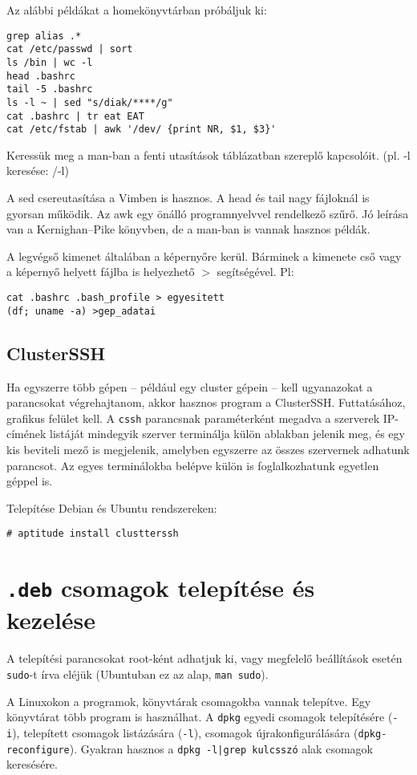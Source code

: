 \documentclass[a4paper]{article}
\newcommand{\code}{\texttt}
\begin{document}
Az alábbi példákat a homekönyvtárban próbáljuk ki:
\begin{Verbatim}
grep alias .*
cat /etc/passwd | sort
ls /bin | wc -l
head .bashrc
tail -5 .bashrc
ls -l ~ | sed "s/diak/****/g"
cat .bashrc | tr eat EAT
cat /etc/fstab | awk '/dev/ {print NR, $1, $3}'
\end{Verbatim}
Keressük meg a man-ban a fenti utasítások táblázatban szereplő
kapcsolóit. (pl. -l keresése: /-l)

A sed csereutasítása a Vimben is hasznos. A head és tail nagy fájloknál is
gyorsan működik. Az awk egy önálló programnyelvvel rendelkező szűrő.
Jó leírása van a Kernighan--Pike könyvben, de a man-ban is vannak
hasznos példák.

A legvégső kimenet általában a képernyőre kerül.  Bárminek a kimenete
cső vagy a képernyő  helyett fájlba is helyezhető $>$ segítségével.
Pl:
\begin{Verbatim}
cat .bashrc .bash_profile > egyesitett
(df; uname -a) >gep_adatai
\end{Verbatim}

\subsection{ClusterSSH}
Ha egyszerre több gépen -- például egy cluster gépein -- kell
ugyanazokat a parancsokat végrehajtanom, akkor hasznos program a
ClusterSSH. Futtatásához, grafikus felület kell. A \texttt{cssh}
parancsnak paraméterként megadva a szerverek IP-címének listáját
mindegyik szerver terminálja külön ablakban jelenik meg, és egy kis
beviteli mező is megjelenik, amelyben egyszerre az összes szervernek
adhatunk parancsot.  Az egyes terminálokba belépve külön is
foglalkozhatunk egyetlen géppel is.

Telepítése Debian és Ubuntu rendszereken:
\begin{Verbatim}
# aptitude install clustterssh
\end{Verbatim}

\newpage
\section{\code{.deb} csomagok telepítése és kezelése}

A telepítési parancsokat root-ként adhatjuk ki, vagy megfelelő
beállítások esetén \code{sudo}-t írva eléjük (Ubuntuban ez az alap,
\code{man sudo}).

A Linuxokon a programok, könyvtárak csomagokba vannak telepítve. Egy
könyvtárat több program is használhat. A \code{dpkg} egyedi csomagok
telepítésére  (\code{-i}), telepített csomagok listázására (\code{-l}),
csomagok újrakonfigurálására (\code{dpkg-reconfigure}).
Gyakran hasznos a \code{dpkg -l|grep kulcsszó} alak csomagok keresésére.
\end{document}
